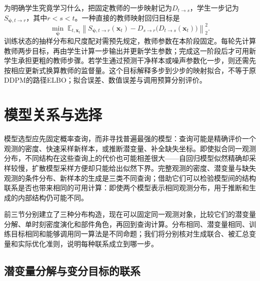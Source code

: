 为明确学生究竟学习什么，把固定教师的一步映射记为$D_{t\to s}$，学生一步记为$S_{\bm\psi,t\to r}$，其中$r<s<t$。一种直接的教师映射回归目标是
\begin{equation}
  \label{eq:pgm-generative-distillation-objective}
  \min_{\bm\psi}\;
  \mathbb E_{t,\bm x_t}
    \left\|S_{\bm\psi,t\to r}(\bm x_t)
       -D_{s\to r}\bigl(D_{t\to s}(\bm x_t)\bigr)\right\|_2^2.
\end{equation}
训练状态的抽样分布和尺度配对需预先规定，教师参数在本阶段固定。每轮先计算教师两步目标，再由学生计算一步输出并更新学生参数；完成这一阶段后才可用新学生承担更粗的教师步骤。若学生通过预测干净样本或噪声参数化一步，则还需先按相应更新式换算教师的监督量。这个目标解释多步到少步的映射拟合，不等于原DDPM的路径ELBO；拟合误差、数值误差与调用预算分别评价。

\section{模型关系与选择}

\label{sec:pgm-generative-comparison}

模型选型应先固定概率查询，而非寻找普遍最强的模型：查询可能是精确评价一个观测的密度、快速采样新样本，或推断潜变量、补全缺失坐标。即使拟合同一观测分布，不同结构在这些查询上的代价也可能相差很大——自回归模型似然精确却采样较慢，扩散模型采样方便却只能给出似然下界。完整观测的密度、潜变量与缺失观测的条件分布、新样本的生成是三类不同查询；借助它们可以检验模型间的结构联系是否也带来相同的可用计算：即使两个模型表示相同观测分布，用于推断和生成的内部结构仍可能不同。

前三节分别建立了三种分布构造，现在可以固定同一观测对象，比较它们的潜变量分解、单时刻密度演化和部件角色，再回到查询计算。分布相同、潜变量相同、训练目标相同和能够调用同一算法是不同命题；我们将分别核对生成联合、被汇总变量和实际优化准则，说明每种联系成立到哪一步。

\subsection{潜变量分解与变分目标的联系}
\label{sec:pgm-generative-latent-relations}

